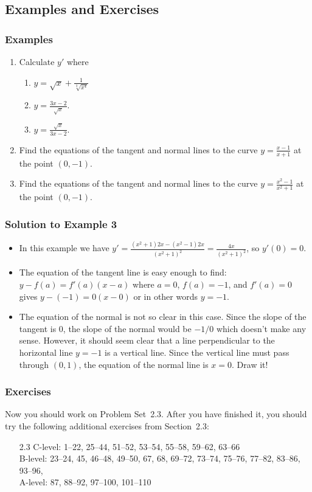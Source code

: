 \documentclass[serif,ignorenonframetext]{beamer}
\newcommand{\ds}{\displaystyle}
\begin{document}
\subsection{Examples and Exercises}

\begin{frame}
  \frametitle{Examples}
  \begin{enumerate}
  \item Calculate $y'$ where 
    \begin{enumerate}
    \item $\ds y=\sqrt{x} + \frac{1}{\sqrt[3]{x^4}}$
    \item $\ds y=\frac{3x-2}{\sqrt{x}}$.
    \item $\ds y=\frac{\sqrt{x}}{3x-2}$.
    \end{enumerate}
  \item Find the equations of the tangent and normal lines to the
    curve $\ds y=\frac{x-1}{x+1}$ at the point $(0,-1)$.
  \item Find the equations of the tangent and normal lines to the 
    curve $\ds y=\frac{x^2-1}{x^2+1}$ at the point $(0,-1)$.
  \end{enumerate}
\end{frame}

\begin{frame}
  \frametitle{Solution to Example 3}
  \begin{itemize}
  \item In this example we have 
    $\ds y'=\frac{(x^2+1)2x - (x^2-1)2x}{(x^2+1)^2}
    = \frac{4x}{(x^2+1)^2}$, so $y'(0)=0$.  
  \item The equation of the tangent
    line is easy enough to find: $y-f(a)=f'(a)(x-a)$ where $a=0$, $f(a)=-1$,
    and $f'(a)=0$ gives $y-(-1)=0(x-0)$ or in other words $y=-1$.
  \item The equation of the normal is not so clear in this case.  Since 
    the slope of the tangent is $0$, the slope of the normal would be
    $-1/0$ which doesn't make any sense.  However, it should seem clear that
    a line perpendicular to the horizontal line $y=-1$ is a vertical line.
    Since the vertical line must pass through $(0,1)$, the
    equation of the normal line is $x=0$.  Draw it!
  \end{itemize}
\end{frame}

\begin{frame}
  \frametitle{Exercises}
  Now you should work on Problem Set~2.3.  After you have finished it,
  you should try the following additional exercises from Section~2.3:
  \begin{itemize}
  \item[2.3] 
    C-level: 1--22, 25--44, 51--52, 53--54, 55--58, 59--62, 63--66 \\
    B-level: 23--24, 45, 46--48, 49--50, 67, 68, 69--72, 73--74, 75--76,
    77--82, 83--86, 93--96, \\
    A-level: 87, 88--92, 97--100, 101--110
  \end{itemize}
 \end{frame}
\end{document}
